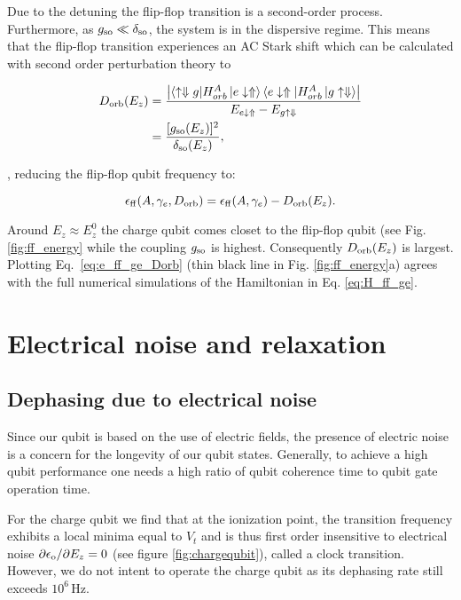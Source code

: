Due to the detuning the flip-flop transition is a second-order process. Furthermore, as $g_{\rm so}\ll \delta_{\rm so}$, the system is in the dispersive regime. This means that the flip-flop transition experiences an AC Stark shift which can be calculated with second order perturbation theory to

\begin{equation}
\label{eq:Dorb}
\begin{aligned} 
D_{\rm orb}(E_z)&=\frac{\left| \langle \uparrow\Downarrow g|H_{orb}^A\ket{e\downarrow\Uparrow}\langle e\downarrow\Uparrow|H_{orb}^A\ket{g\uparrow\Downarrow}\right|}{E_{e\downarrow\Uparrow}-E_{g\uparrow\Downarrow}}\\
&=\frac{[g_{\rm so}(E_z)]^2}{\delta_{\rm so}(E_z)},
\end{aligned}
\end{equation}

\cite{Blais2004}, reducing the flip-flop qubit frequency to:

\begin{equation} \label{eq:e_ff_ge_Dorb}
\epsilon_{\rm ff}(A,\gamma_e,D_{\rm orb})=\epsilon_{\rm ff}(A,\gamma_e)-D_{\rm orb}(E_z).
\end{equation}

Around $E_z\approx E_z^0$ the charge qubit comes closet to the flip-flop qubit (see Fig. \ref{fig:ff_energy} while the coupling $g_{\rm so}$ is highest. Consequently $D_{\rm orb}(E_z)$ is largest. Plotting Eq.~\eqref{eq:e_ff_ge_Dorb} (thin black line in Fig. \ref{fig:ff_energy}a) agrees with the full numerical simulations of the Hamiltonian in Eq. \eqref{eq:H_ff_ge}. 


\section{Electrical noise and relaxation} \label{sec:noise}

\subsection{Dephasing due to electrical noise} \label{sec:ff_dephasing}

Since our qubit is based on the use of electric fields, the presence of electric noise is a concern for the longevity of our qubit states. Generally, to achieve a high qubit performance one needs a high ratio of qubit coherence time to qubit gate operation time. 

For the charge qubit we find that at the ionization point, the transition frequency exhibits a local minima equal to $V_t$ and is thus first order insensitive to electrical noise $\partial\epsilon_{\rm o}/\partial E_z=0$ (see figure \ref{fig:chargequbit}), called a clock transition. However, we do not intent to operate the charge qubit as its dephasing rate still exceeds $10^6\,$Hz. 


